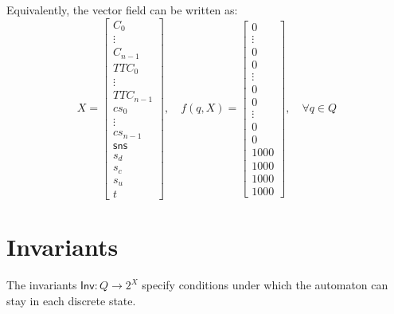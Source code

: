 \documentclass[12pt]{article}
\theoremstyle{definition}
\begin{document}
Equivalently, the vector field can be written as:
\[
X = 
\begin{bmatrix}
    C_0 \\ \vdots \\ C_{n-1} \\ 
    TTC_0 \\ \vdots \\ TTC_{n-1} \\ 
    cs_0 \\ \vdots \\ cs_{n-1} \\ 
    \mathsf{sns} \\
    s_d \\ s_c \\ s_u \\ t
\end{bmatrix}, \quad
f(q, X) =
\begin{bmatrix}
    0 \\ \vdots \\ 0 \\ 
    0 \\ \vdots \\ 0 \\ 
    0 \\ \vdots \\ 0 \\ 0 \\
    1000 \\ 1000 \\ 1000 \\ 1000
\end{bmatrix}, \quad \forall q \in Q
\]

\section{Invariants}

The invariants $\mathsf{Inv}: Q \to 2^X$ specify conditions under which the automaton can stay in each discrete state.
\end{document}
